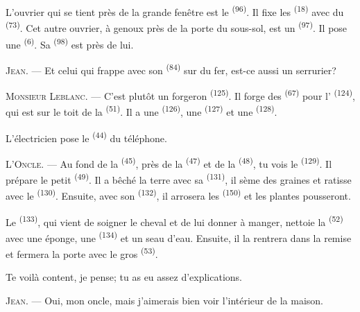 L'ouvrier qui se tient près de la grande fenêtre est le 
\textsuperscript{(96)}. Il fixe les  \textsuperscript{(18)} avec
du  \textsuperscript{(73)}. Cet autre ouvrier, à genoux près de
la porte du sous-sol, est un  \textsuperscript{(97)}. Il pose
une  \textsuperscript{(6)}. Sa 
\textsuperscript{(98)} est près de lui.

\textsc{Jean}. --- Et celui qui frappe avec son 
\textsuperscript{(84)} sur du fer, est-ce aussi un serrurier?

\textsc{Monsieur Leblanc}. --- C'est plutôt un forgeron \textsuperscript{(125)}.
Il forge des  \textsuperscript{(67)} pour
l' \textsuperscript{(124)}, qui est sur le toit de la
 \textsuperscript{(51)}. Il a une 
\textsuperscript{(126)}, une  \textsuperscript{(127)} et une
 \textsuperscript{(128)}.

L'électricien pose le  \textsuperscript{(44)} du
téléphone.

\VUsaut{3.0mm}

\textsc{L'Oncle}. --- Au fond de la  \textsuperscript{(45)}, près
de la  \textsuperscript{(47)} et de la 
\textsuperscript{(48)}, tu vois le  \textsuperscript{(129)}.
Il prépare le petit  \textsuperscript{(49)}. Il a bêché la terre
avec sa  \textsuperscript{(131)}, il sème des graines et ratisse
avec le  \textsuperscript{(130)}. Ensuite, avec son
 \textsuperscript{(132)}, il arrosera les
 \textsuperscript{(150)} et les plantes pousseront.

Le  \textsuperscript{(133)}, qui vient de soigner le cheval
et de lui donner à manger, nettoie la  \textsuperscript{(52)}
avec une éponge, une  \textsuperscript{(134)} et un seau
d'eau. Ensuite, il la rentrera dans la remise et fermera la porte avec le gros
 \textsuperscript{(53)}.

Te voilà content, je pense; tu as eu assez d'explications.

\textsc{Jean}. --- Oui, mon oncle, mais j'aimerais bien voir l'intérieur de la
maison.

